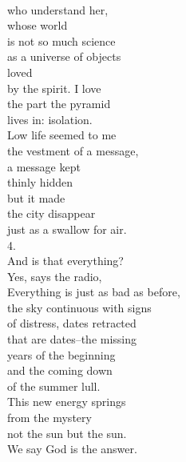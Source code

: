 \documentclass[smalldemyvopaper,11pt,twoside,onecolumn,openright,extrafontsizes]{memoir}
\begin{document}
\\who understand her,
\\whose world
\\is not so much science
\\as a universe of objects
\\loved
\\by the spirit. I love
\\the part the pyramid
\\lives in: isolation.
\\Low life seemed to me
\\the vestment of a message,
\\a message kept
\\thinly hidden
\\but it made
\\the city disappear
\\just as a swallow for air.
\\4.
\\And is that everything?
\\Yes, says the radio,
\\Everything is just as bad as before,
\\the sky continuous with signs
\\of distress, dates retracted
\\that are dates--the missing
\\years of the beginning
\\and the coming down
\\of the summer lull.
\\This new energy springs
\\from the mystery
\\not the sun but the sun.
\\We say God is the answer.
\end{document}
